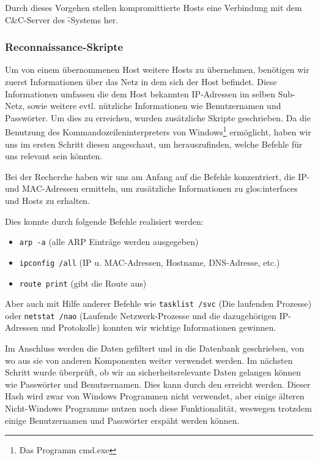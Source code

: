 Durch dieses Vorgehen stellen kompromittierte Hosts eine Verbindung
mit dem C\&C-Server des \f-Systems her.

\subsubsection{Reconnaissance-Skripte}
\label{sec:reconnaissance}
\authors{\WF\and\KUH}{\LM \and \DE \and \MW \and \JF}

Um von einem übernommenen Host weitere Hosts zu übernehmen, benötigen
wir zuerst Informationen über das Netz in dem sich der Host befindet.
Diese Informationen umfassen die dem Host bekannten IP-Adressen im
selben Sub-Netz, sowie weitere evtl. nützliche Informationen wie \zB
Benutzernamen und Passwörter. Um dies zu erreichen, wurden zusätzliche
Skripte geschrieben. Da  die Benutzung des
Kommandozeileninterpreters von Windows\footnote{Das Programm
  cmd.exe} ermöglicht, haben
wir uns im ersten Schritt diesen angeschaut, um herauszufinden, welche
Befehle für uns relevant sein könnten.

Bei der Recherche haben wir uns am Anfang auf die Befehle
konzentriert, die IP- und MAC-Adressen ermitteln, um zusätzliche Informationen
zu \glspl{glos:interface} und Hosts zu erhalten.

Dies konnte durch folgende Befehle realisiert werden:

\begin{itemize}
  \item \texttt{arp -a} (alle ARP Einträge werden ausgegeben)
  \item \texttt{ipconfig /all} (IP u. MAC-Adressen, Hostname, DNS-Adresse, etc.)
  \item \texttt{route print} (gibt die Route aus)
\end{itemize}

Aber auch mit Hilfe anderer Befehle wie \texttt{tasklist /svc} (Die laufenden
Prozesse) oder \texttt{netstat /nao} (Laufende Netzwerk-Prozesse und die
dazugehörigen IP-Adressen und Protokolle) konnten wir wichtige Informationen
gewinnen. 

Im Anschluss werden die Daten gefiltert und in die Datenbank
geschrieben, von wo aus sie von anderen Komponenten weiter verwendet
werden.  Im nächsten Schritt wurde überprüft, ob wir an
sicherheitsrelevante Daten gelangen können wie \zB Passwörter und
Benutzernamen. Dies kann \zB durch den  erreicht
werden. Dieser Hash wird zwar von Windows Programmen nicht verwendet, aber 
einige älteren Nicht-Windows Programme nutzen noch diese Funktionalität, 
weswegen trotzdem einige Benutzernamen und Passwörter erspäht werden können. 

